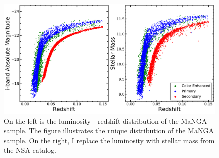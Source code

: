 \documentclass[iop,revtex4,twocolumn,apj,numberedappendix,appendixfloats]{emulateapj}
\begin{document}
\begin{figure}
\centering
\includegraphics[width=\linewidth]{fig/Mi-z.pdf}
\caption[The luminosity - redshift distribution and mass - redshift distribution of the MaNGA sample.]{On the left is the luminosity - redshift distribution of the MaNGA sample. The figure illustrates the unique distribution of the MaNGA sample. On the right, I replace the luminosity with stellar mass from the NSA catalog.}
\label{fig:Mi-z}
\end{figure}
\end{document}
